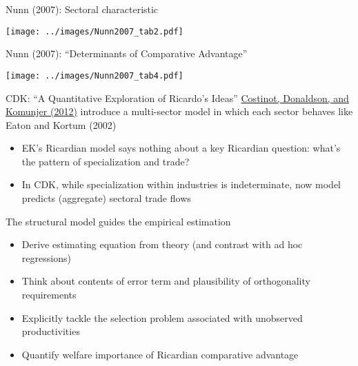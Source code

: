 \documentclass[11pt,notes=hide,aspectratio=169]{beamer}
\begin{document}
\begin{frame}{Nunn (2007): Sectoral characteristic}
\begin{center}\texttt{[image: ../images/Nunn2007\_tab2.pdf]}\end{center}
\end{frame}
\begin{frame}{Nunn (2007): ``Determinants of Comparative Advantage''}
\begin{center}\texttt{[image: ../images/Nunn2007\_tab4.pdf]}\end{center}
\end{frame}
\begin{frame}{CDK: ``A Quantitative Exploration of Ricardo's Ideas''}
\href{https://doi.org/10.1093/restud/rdr033}{Costinot, Donaldson, and Komunjer (2012)} introduce a multi-sector model in which each sector behaves like Eaton and Kortum (2002)
\begin{itemize}
	\item EK's Ricardian model says nothing about a key Ricardian question: what's the pattern of specialization and trade?
	\item In CDK, while specialization within industries is indeterminate, now model predicts (aggregate) sectoral trade flows
\end{itemize}
The structural model guides the empirical estimation
\begin{itemize}
	\item Derive estimating equation from theory {\footnotesize (and contrast with ad hoc regressions)}
	\item Think about contents of error term and plausibility of orthogonality requirements
	\item Explicitly tackle the selection problem associated with unobserved productivities
	\item Quantify welfare importance of Ricardian comparative advantage
\end{itemize}
\end{frame}
\end{document}
